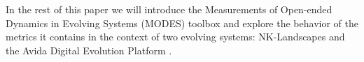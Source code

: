 \documentclass[letterpaper]{article}
\begin{document}

In the rest of this paper we will introduce the Measurements of Open-ended Dynamics in Evolving Systems (MODES) toolbox and explore the behavior of the metrics it contains in the context of two evolving systems: NK-Landscapes \citep{kauffman_towards_1987} and the Avida Digital Evolution Platform \citep{ofria_avida:_2004}.



\end{document}
